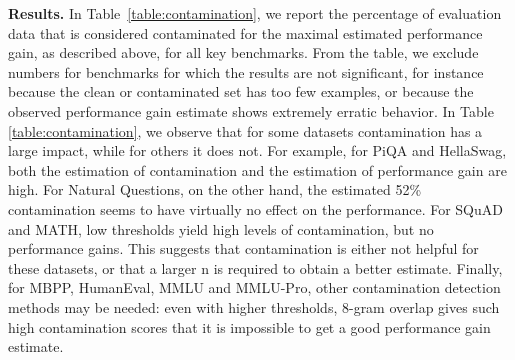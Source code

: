\textbf{Results.}
In Table~\ref{table:contamination}, we report the percentage of evaluation data that is considered contaminated for the maximal estimated performance gain, as described above, for all key benchmarks.
From the table, we exclude numbers for benchmarks for which the results are not significant, for instance because the clean or contaminated set has too few examples, or because the observed performance gain estimate shows extremely erratic behavior.
In Table \ref{table:contamination}, we observe that for some datasets contamination has a large impact, while for others it does not.
For example, for PiQA and HellaSwag, both the estimation of contamination and the estimation of performance gain are high.
For Natural Questions, on the other hand, the estimated 52\% contamination seems to have virtually no effect on the performance.
For SQuAD and MATH, low thresholds yield high levels of contamination, but no performance gains. This suggests that contamination is either not helpful for these datasets, or that a larger n is required to obtain a better estimate.
Finally, for MBPP, HumanEval, MMLU and MMLU-Pro, other contamination detection methods may be needed: even with higher thresholds, 8-gram overlap gives such high contamination scores that it is impossible to get a good performance gain estimate.





